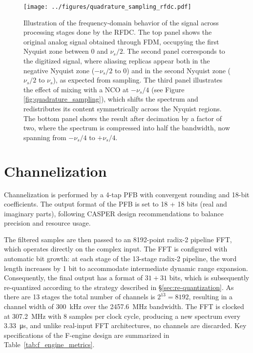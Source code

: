 \begin{figure}[h!]
    \centering
    \texttt{[image: ../figures/quadrature\_sampling\_rfdc.pdf]}
    \caption[Illustration of the frequency-domain behavior of the signal across processing stages done by the RFDC]{Illustration of the frequency-domain behavior of the signal across processing stages done by the RFDC. The top panel shows the original analog signal obtained through FDM, occupying the first Nyquist zone between $0$ and $\nu_s/2$. The second panel corresponds to the digitized signal, where aliasing replicas appear both in the negative Nyquist zone ($-\nu_s/2$ to $0$) and in the second Nyquist zone ($\nu_s/2$ to $\nu_s$), as expected from sampling. The third panel illustrates the effect of mixing with a NCO at $-\nu_s/4$ (see Figure \ref{fig:quadrature_sampling}), which shifts the spectrum and redistributes its content symmetrically across the Nyquist regions. The bottom panel shows the result after decimation by a factor of two, where the spectrum is compressed into half the bandwidth, now spanning from $-\nu_s/4$ to $+\nu_s/4$.}
    \label{fig:quadrature_sampling_rfdc}
\end{figure}


\section{Channelization}
\label{sec:channelization}

Channelization is performed by a 4-tap PFB with convergent rounding and 18-bit coefficients. The output format of the PFB is set to 18 + 18 bits (real and imaginary parts), following CASPER design recommendations to balance precision and resource usage. 


The filtered samples are then passed to an 8192-point radix-2 pipeline FFT, which operates directly on the complex input.  The FFT is configured with automatic bit growth: at each stage of the 13-stage radix-2 pipeline, the word length increases by 1 bit to accommodate intermediate dynamic range expansion. Consequently, the final output has a format of $31 + 31$ bits, which is subsequently re-quantized according to the strategy described in \S\ref{sec:re-quantization}. As there are 13 stages the total number of channels is $2^{13} = 8192$, resulting in a channel width of \SI{300}{\kilo\hertz} over the \SI{2457.6}{\mega\hertz} bandwidth. The FFT is clocked at \SI{307.2}{\mega\hertz} with 8 samples per clock cycle, producing a new spectrum every \SI{3.33}{\micro\second}, and unlike real-input FFT architectures, no channels are discarded. 
Key specifications of the F-engine design are summarized in Table~\ref{tab:f_engine_metrics}.

